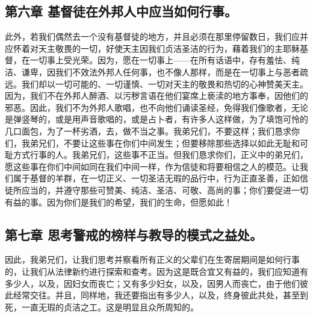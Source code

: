 
\subsection{第六章 基督徒在外邦人中应当如何行事。}

此外，若我们偶然去一个没有基督徒的地方，并且必须在那里停留数日，我们应并应怀着对天主敬畏的一切，好使天主因我们贞洁圣洁的行为，藉着我们的主耶稣基督，在一切事上受光荣。因为，愿在一切事上——在所有话语中，存有羞怯、纯洁、谦卑，因我们不效法外邦人任何事，也不像人那样，而是在一切事上与恶者疏远。我们却以一切可能的、一切谨慎、一切对天主的敬畏和热切的心神赞美天主。因为，我们不在外邦人醉酒、以污秽言语在他们宴席上亵渎的地方事奉，因他们的邪恶。因此，我们不为外邦人歌唱，也不向他们诵读圣经，免得我们像歌者，无论是弹竖琴的，或是用声音歌唱的，或是占卜者，有许多人这样做，为了填饱可怜的几口面包，为了一杯劣酒，去，做不当之事。我弟兄们，不要这样；我们恳求你们，我弟兄们，不要让这些事在你们中间发生；但要移除那些选择以如此无耻和可耻方式行事的人。我弟兄们，这些事不正当。但我们恳求你们，正义中的弟兄们，愿这些事在你们中间如同在我们中间一样，作为信徒和将要相信之人的模范。让我们属于基督的羊群，在一切正义、一切圣洁无瑕的品行中，行为正直圣善，正如信徒所应当的，并遵守那些可赞美、纯洁、圣洁、可敬、高尚的事；你们要促进一切有益的事。因为你们是我们的希望，我们的生命，但愿如此！\par


\subsection{第七章 思考警戒的榜样与教导的模式之益处。}

因此，我弟兄们，让我们思考并察看所有正义的父辈们在生寄居期间是如何行事的，让我们从法律新约进行探索和查考。因为这是既合宜又有益的，我们应知道有多少人，以及，因妇女而丧亡；又有多少妇女，以及，因男人而丧亡，由于他们彼此经常交往。并且，同样地，我还要指出有多少人，以及，终身彼此共处，甚至到死，一直无瑕的贞洁之工。这是明显且众所周知的。\par

